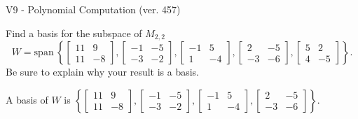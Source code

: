 \begin{exercise}
  \begin{exerciseTitle}V9 - Polynomial Computation (ver. 457)\end{exerciseTitle}
  \begin{exerciseStatement}
    Find a basis for the subspace of \(M_{2,2}\) 
\[W=\mathrm{span}\ \left\{\left[\begin{array}{cc}
11 & 9 \\
11 & -8
\end{array}\right] , \left[\begin{array}{cc}
-1 & -5 \\
-3 & -2
\end{array}\right] , \left[\begin{array}{cc}
-1 & 5 \\
1 & -4
\end{array}\right] , \left[\begin{array}{cc}
2 & -5 \\
-3 & -6
\end{array}\right] , \left[\begin{array}{cc}
5 & 2 \\
4 & -5
\end{array}\right]\right\}.\]
 Be sure to explain why your result is a basis.


  \end{exerciseStatement}
  \begin{exerciseAnswer}
   A basis of \(W\) is  \(\left\{\left[\begin{array}{cc}
11 & 9 \\
11 & -8
\end{array}\right] , \left[\begin{array}{cc}
-1 & -5 \\
-3 & -2
\end{array}\right] , \left[\begin{array}{cc}
-1 & 5 \\
1 & -4
\end{array}\right] , \left[\begin{array}{cc}
2 & -5 \\
-3 & -6
\end{array}\right]\right\}\).
  


  \end{exerciseAnswer}
\end{exercise}